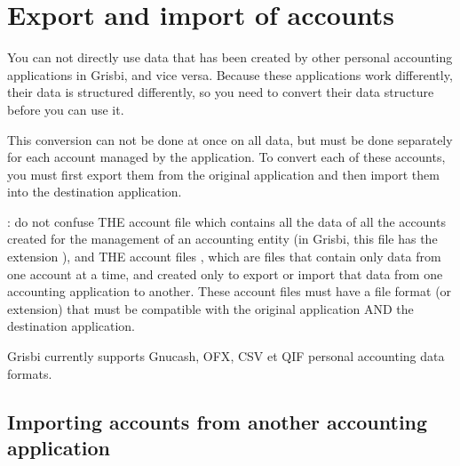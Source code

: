 

\chapter{Export and import of accounts\label{move}}

You can not directly use data that has been created by other personal accounting applications in Grisbi, and vice versa. Because these applications work differently, their data is structured differently, so you need to convert their data structure before you can use it. 

This conversion can not be done at once on all data, but must be done separately for each account managed by the application. To convert each of these accounts, you must first \og export \fg{}them from the original application and then \og import \fg{} them into the destination application.


 :  do not confuse THE \og account file \fg{}which contains all the data of all the accounts created for the management of an accounting entity (in Grisbi, this file has the \gls{extension} ), and THE \og account files \fg{}, which are files that contain only data from one account at a time, and created only to export or import that data from one accounting application to another. These \og account files  \fg{}  must have a  \gls{file format} (or extension) that must be compatible with the original application AND the destination application.

Grisbi currently supports \gls{Gnucash}, \gls{OFX}, \gls{CSV} et \gls{QIF} personal accounting data formats.

\section{Importing accounts from another accounting application\label{move-import}}

